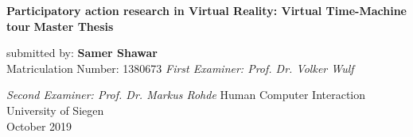 \begin{titlepage}
    \begin{center}
        \vspace*{1cm}
        \Huge
        \textbf{Participatory action research in Virtual Reality: Virtual Time-Machine tour}
        \vfill
        \LARGE
        \textbf{Master Thesis}
        
        \vspace{0.5cm}
        submitted by:
        \vspace{1.5cm}
        \textbf{Samer Shawar}\\
        Matriculation Number: 1380673
        \vfill
        \textit {First Examiner: Prof. Dr. Volker Wulf}
        
        
        \textit {Second Examiner: Prof. Dr. Markus Rohde}
        \vfill
        \Large
        Human Computer Interaction\\
        University of Siegen\\
        October 2019\\
 \end{center}
\end{titlepage}